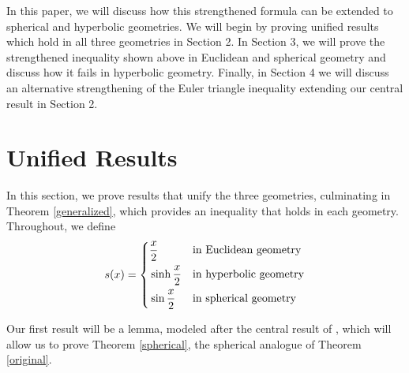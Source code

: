 \documentclass[12pt,notitlepage]{amsart}%
\newcommand{\s}[1]{\sin \frac{#1}{2}}
\newcommand{\sh}[1]{\sinh \frac{#1}{2}}
\begin{document}
In this paper, we will discuss how this strengthened formula can be extended to spherical and hyperbolic geometries. We will begin by proving unified results which hold in all three geometries in Section 2. In Section 3, we will prove the strengthened inequality shown above in Euclidean and spherical geometry and discuss how it fails in hyperbolic geometry. Finally, in Section 4 we will discuss an alternative strengthening of the Euler triangle inequality extending our central result in Section 2. 

\section{Unified Results}
In this section, we prove results that unify the three geometries, culminating in Theorem \ref{generalized}, which provides an inequality that holds in each geometry. 
Throughout, we define
\begin{equation*}
	s(x) = \label{s-func}
    \left\{
	\begin{aligned}
						&\frac{x}{2} 	&&\textnormal{in Euclidean geometry} \\
						&\sh{x}			&&\textnormal{in hyperbolic geometry} \\
						&\s{x}			&&\textnormal{in spherical geometry} \\
	\end{aligned}
\right.
\end{equation*}

Our first result will be a lemma, modeled after the central result of \cite{GN}, which will allow us to prove Theorem \ref{spherical}, the spherical analogue of Theorem \ref{original}.

\end{document}
